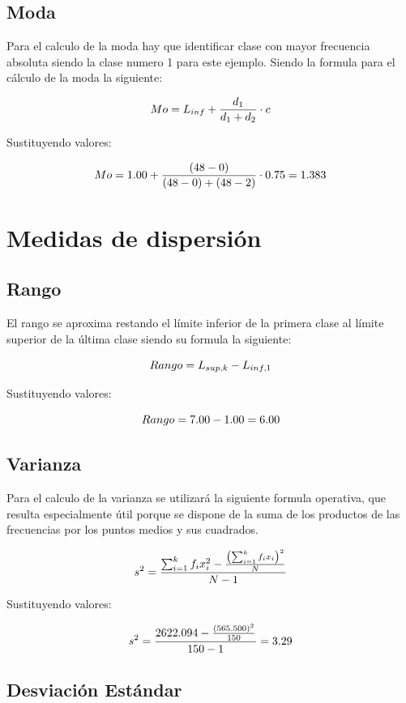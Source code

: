 \documentclass[
  spanish,
  letterpaper,
]{book}
\begin{document}
\subsection{Moda}\label{moda-3}

Para el calculo de la moda hay que identificar clase con mayor
frecuencia absoluta siendo la clase numero 1 para este ejemplo. Siendo
la formula para el cálculo de la moda la siguiente:

\[ \huge Mo = L_{inf} + \frac{d_1}{d_1 + d_2} \cdot c\]

Sustituyendo valores:

\[ \LARGE Mo = 1.00 + \frac{(48-0)}{(48-0) + (48-2)} \cdot 0.75=1.383\]

\section{Medidas de dispersión}\label{medidas-de-dispersiuxf3n-2}

\subsection{Rango}\label{rango-3}

El rango se aproxima restando el límite inferior de la primera clase al
límite superior de la última clase siendo su formula la siguiente:

\[\huge Rango = L_{sup,k} - L_{inf,1}\]

Sustituyendo valores:

\[\huge Rango = 7.00 - 1.00=6.00\]

\subsection{Varianza}\label{varianza-3}

Para el calculo de la varianza se utilizará la siguiente formula
operativa, que resulta especialmente útil porque se dispone de la suma
de los productos de las frecuencias por los puntos medios y sus
cuadrados.

\[ \LARGE s^2 = \frac{\sum_{i=1}^{k} f_i x_i^2 - \frac{\left(\sum_{i=1}^{k} f_i x_i\right)^2}{N}}{N - 1}\]

Sustituyendo valores:

\[ \LARGE s^2 = \frac{2622.094 - \frac{\left(565.500\right)^2}{150}}{150 - 1}=3.29\]

\subsection{Desviación Estándar}\label{desviaciuxf3n-estuxe1ndar-3}
\end{document}
